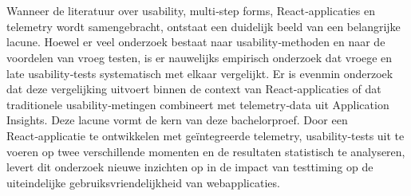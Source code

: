 \section{} 
Wanneer de literatuur over usability, multi‑step forms, React‑applicaties en telemetry wordt samengebracht, ontstaat een duidelijk beeld van een belangrijke lacune. Hoewel er veel onderzoek bestaat naar usability‑methoden en naar de voordelen van vroeg testen, is er nauwelijks empirisch onderzoek dat vroege en late usability‑tests systematisch met elkaar vergelijkt. Er is evenmin onderzoek dat deze vergelijking uitvoert binnen de context van React‑applicaties of dat traditionele usability‑metingen combineert met telemetry‑data uit Application Insights. Deze lacune vormt de kern van deze bachelorproef. Door een React‑applicatie te ontwikkelen met geïntegreerde telemetry, usability‑tests uit te voeren op twee verschillende momenten en de resultaten statistisch te analyseren, levert dit onderzoek nieuwe inzichten op in de impact van testtiming op de uiteindelijke gebruiksvriendelijkheid van webapplicaties.
